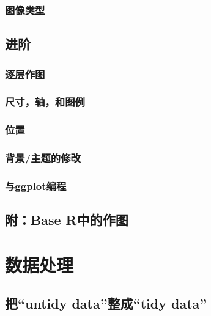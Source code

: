 \documentclass[]{book}
\begin{document}
\hypertarget{g-basics-types}{%
\subsection{图像类型}\label{g-basics-types}}

\hypertarget{g-intermediate}{%
\section{进阶}\label{g-intermediate}}

\hypertarget{g-lay}{%
\subsection{逐层作图}\label{g-lay}}

\hypertarget{g-legend}{%
\subsection{尺寸，轴，和图例}\label{g-legend}}

\hypertarget{g-pos}{%
\subsection{位置}\label{g-pos}}

\hypertarget{g-theme}{%
\subsection{背景/主题的修改}\label{g-theme}}

\hypertarget{g-programming}{%
\subsection{与ggplot编程}\label{g-programming}}

\hypertarget{g-base}{%
\section{附：Base R中的作图}\label{g-base}}

\hypertarget{wrangle}{%
\chapter{数据处理}\label{wrangle}}

\hypertarget{untidy-to-tidy}{%
\section{把``untidy data''整成``tidy data''}\label{untidy-to-tidy}}
\end{document}
